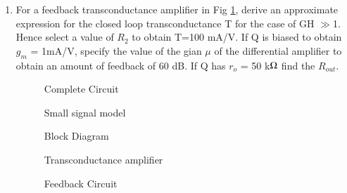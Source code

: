 \begin{enumerate}[label=\arabic*.,ref=\theenumi]

\item For a feedback transconductance amplifier in Fig \ref{fig:fig1}, derive an approximate expression for the closed loop transconductance T for the case of GH $\gg$1. Hence select a value of $R_2$ to obtain T=100 mA/V. If Q is biased to obtain $g_m$ = 1mA/V, specify  the value of the gian $\mu$ of the differential amplifier to obtain an amount of feedback of 60 dB. If Q has $r_o$ = 50 k$\ohm$ find the $R_{out}$.

\begin{figure}[!ht]
	\begin{center}
		\resizebox{\columnwidth}{!}{}
	\end{center}
\caption{Complete Circuit}
\label{fig:fig1}
\end{figure}


\begin{figure}[!ht]
	\begin{center}
		\resizebox{\columnwidth}{!}{}
	\end{center}
\caption{Small signal model}
\label{fig:fig2}
\end{figure}



\begin{figure}[!ht]
	\begin{center}
		\resizebox{\columnwidth}{!}{}
	\end{center}
\caption{Block Diagram}
\label{fig:fig3}
\end{figure}

\begin{figure}[!ht]
	\begin{center}
		\resizebox{\columnwidth}{!}{}
	\end{center}
\caption{Transconductance amplifier}
\label{fig:fig4}
\end{figure}

\begin{figure}[!ht]
	\begin{center}
		\resizebox{\columnwidth}{!}{}
	\end{center}
\caption{Feedback Circuit}
\label{fig:fig5}
\end{figure}





\end{enumerate}
